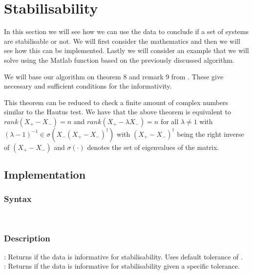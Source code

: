 \section{Stabilisability}
In this section we will see how we can use the data to conclude if a set of systems are stabilisable or not. We will first consider the mathematics and then we will see how this can be implemented. Lastly we will consider an example that we will solve using the Matlab function based on the previously discussed algorithm.


We will base our algorithm on theorem 8 and remark 9 from \cite{waarde2019data}. These give necessary and sufficient conditions for the informativity.


This theorem can be reduced to check a finite amount of complex numbers similar to the Hautus test. We have that the above theorem is equivalent to $rank(X_+ - X_-) = n$ and $rank(X_+ - \lambda X_-) = n$ for all $\lambda \neq 1$ with $(\lambda - 1)^{-1} \in \sigma(X_- (X_+ - X_-)^\dagger)$ with $(X_+ - X_-)^\dagger$ being the right inverse of $(X_+ - X_-)$ and $\sigma(\cdot)$ denotes the set of eigenvalues of the matrix.




\subsection{Implementation}
\subsubsection*{Syntax}
 \\

\subsubsection*{Description}
: Returns if the data is informative for stabilisability. Uses default tolerance of .\\
: Returns if the data is informative for stabilisability given a specific tolerance.  

